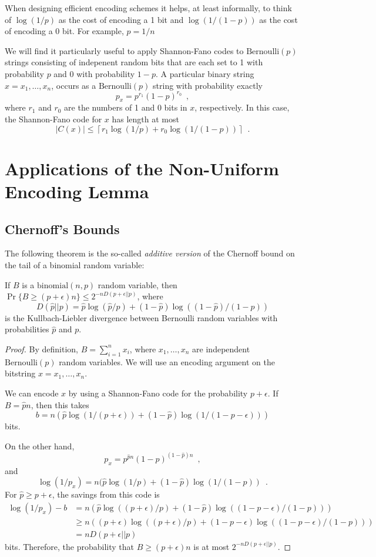 \documentclass{patmorin}
\begin{document}
When designing efficient encoding schemes it helps, at least
informally, to think of $\log(1/p)$ as the cost of encoding a 1 bit and
$\log(1/(1-p))$ as the cost of encoding a 0 bit.  For example, $p=1/n$

We will find it particularly useful to apply Shannon-Fano codes to
$\mathrm{Bernoulli}(p)$ strings consisting of indepenent random bits that
are each set to 1 with probability $p$ and 0 with probability $1-p$.
A particular binary string $x=x_1,\ldots,x_n$, occurs as
a $\mathrm{Bernoulli}(p)$ string with
probability exactly
\[
   p_x= p^{r_1}(1-p)^{r_0} \enspace ,
\]
where $r_1$ and $r_0$ are the numbers of 1 and 0 bits in $x$, respectively. In this case, the Shannon-Fano code for $x$ has length at most
\[
    |C(x)|\le \left\lceil r_1\log (1/p) + r_0\log(1/(1-p)) \right\rceil \enspace .
\]


\section{Applications of the Non-Uniform Encoding Lemma}

\subsection{Chernoff's Bounds}

The following theorem is the so-called \emph{additive version} of the
Chernoff bound on the tail of a binomial random variable:

\begin{thm}
  If $B$ is a $\mathrm{binomial}(n,p)$ random variable, then $\Pr\{B\ge
  (p+\epsilon)n\} \le 2^{-nD(p+\epsilon||p)}$, where 
  \[ 
    D(\hat p||p)=\hat p\log(\hat p/p) + (1-\hat p)\log((1-\hat p)/(1-p)) 
  \] is
  the Kullbach-Liebler divergence between Bernoulli random variables
  with probabilities $\hat p$ and $p$.
\end{thm}

\begin{proof}
By definition, $B=\sum_{i=1}^nx_i$, where $x_1,\ldots,x_n$ are independent $\mathrm{Bernoulli}(p)$ random variables.   We will use an encoding argument on the bitstring $x=x_1,\ldots,x_n$.

We can encode $x$ by using a Shannon-Fano code for the probability
$p+\epsilon$.  If $B=\hat pn$, then this takes
\[
   b = n(\hat p\log(1/(p+\epsilon))+ (1-\hat p)\log(1/(1-p-\epsilon)))
\]
bits.

On the other hand,
\[
    p_x = p^{\hat pn}(1-p)^{(1-\hat p)n} \enspace ,
\]
and
\[
    \log (1/p_x) = n(\hat p\log(1/p)+ (1-\hat p)\log(1/(1-p)) \enspace .
\]
For $\hat p\ge p+\epsilon$, the savings from this code is
\begin{align*}
  \log(1/p_x) - b
    & =  n(\hat p\log((p+\epsilon)/p) + (1-\hat p)\log((1-p-\epsilon)/(1-p))) \\
    & \ge  n((p+\epsilon)\log((p+\epsilon)/p) + (1-p-\epsilon)\log((1-p-\epsilon)/(1-p)))\\
    & =  nD(p+\epsilon||p)
\end{align*}
bits.  Therefore, the probability that $B\ge (p+\epsilon)n$ is at most $2^{-nD(p+\epsilon||p)}$.
\end{proof}
\end{document}
